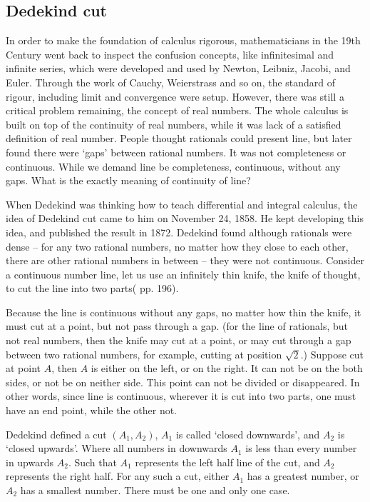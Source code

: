 \documentclass{article}
\begin{document}
\subsection{Dedekind cut}

In order to make the foundation of calculus rigorous, mathematicians in the 19th Century went back to inspect the confusion concepts, like infinitesimal and infinite series, which were developed and used by Newton, Leibniz, Jacobi, and Euler. Through the work of Cauchy, Weierstrass and so on, the standard of rigour, including limit and convergence were setup. However, there was still a critical problem remaining, the concept of real numbers. The whole calculus is built on top of the continuity of real numbers, while it was lack of a satisfied definition of real number. People thought rationals could present line, but later found there were `gaps' between rational numbers. It was not completeness or continuous. While we demand line be completeness, continuous, without any gaps. What is the exactly meaning of continuity of line?

When Dedekind was thinking how to teach differential and integral calculus, the idea of Dedekind cut came to him on November 24, 1858. He kept developing this idea, and published the result in 1872. Dedekind found although rationals were dense -- for any two rational numbers, no matter how they close to each other, there are other rational numbers in between -- they were not continuous. Consider a continuous number line, let us use an infinitely thin knife, the knife of thought, to cut the line into two parts(\cite{HanXueTao16} pp. 196).

Because the line is continuous without any gaps, no matter how thin the knife, it must cut at a point, but not pass through a gap. (for the line of rationals, but not real numbers, then the knife may cut at a point, or may cut through a gap between two rational numbers, for example, cutting at position $\sqrt{2}$.) Suppose cut at point $A$, then $A$ is either on the left, or on the right. It can not be on the both sides, or not be on neither side. This point can not be divided or disappeared. In other words, since line is continuous, wherever it is cut into two parts, one must have an end point, while the other not.

Dedekind defined a cut $(A_1, A_2)$, $A_1$ is called `closed downwards', and $A_2$ is `closed upwards'. Where all numbers in downwards $A_1$ is less than every number in upwards $A_2$. Such that $A_1$ represents the left half line of the cut, and $A_2$ represents the right half. For any such a cut, either $A_1$ has a greatest number, or $A_2$ has a smallest number. There must be one and only one case.
\end{document}
